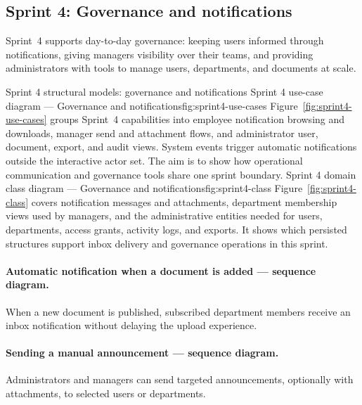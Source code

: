 \subsection{Sprint 4: Governance and notifications}\label{subsec:sprint4-design}

Sprint~4 supports day-to-day governance: keeping users informed through
notifications, giving managers visibility over their teams, and providing
administrators with tools to manage users, departments, and documents at scale.

%
  {Sprint 4 structural models: governance and notifications}%
  {Sprint 4 use-case diagram — Governance and notifications}{fig:sprint4-use-cases}%
  {Figure~\ref{fig:sprint4-use-cases} groups Sprint~4 capabilities into employee
  notification browsing and downloads, manager send and attachment flows, and
  administrator user, document, export, and audit views. System events trigger
  automatic notifications outside the interactive actor set. The aim is to show
  how operational communication and governance tools share one sprint boundary.}%
  {Sprint 4 domain class diagram — Governance and notifications}{fig:sprint4-class}%
  {Figure~\ref{fig:sprint4-class} covers notification messages and attachments,
  department membership views used by managers, and the administrative entities
  needed for users, departments, access grants, activity logs, and exports. It
  shows which persisted structures support inbox delivery and governance
  operations in this sprint.}%



\paragraph{Automatic notification when a document is added --- sequence diagram.}
When a new document is published, subscribed department members receive an inbox
notification without delaying the upload experience.

\paragraph{Sending a manual announcement --- sequence diagram.}
Administrators and managers can send targeted announcements, optionally with
attachments, to selected users or departments.

